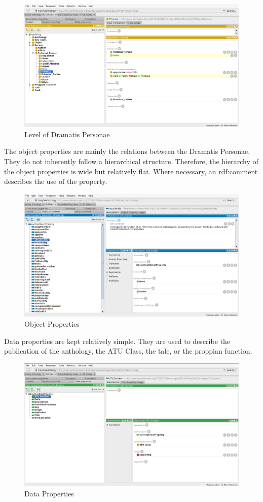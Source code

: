 \documentclass[10pt,a4paper]{article}
\begin{document}
\begin{figure}[H]
\centering
 	\includegraphics[scale=0.25]{Screen3.png}
 	\caption{Level of Dramatis Personae}
\end{figure}

The object properties are mainly the relations between the Dramatis Personae. They do not inherently follow a hierarchical structure. Therefore, the hierarchy of the object properties is wide but relatively flat. Where necessary, an rdf:comment describes the use of the property. 

\begin{figure}[H]
\centering
 	\includegraphics[scale=0.25]{Screen4.png}
 	\caption{Object Properties}
\end{figure}
\newpage

Data properties are kept relatively simple. They are used to describe the publication of the anthology, the ATU Class, the tale, or the proppian function. 
\begin{figure}[H]
\centering
 	\includegraphics[scale=0.25]{Screen5.png}
 	\caption{Data Properties}
\end{figure}
\end{document}
